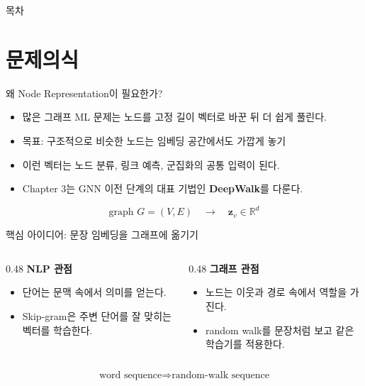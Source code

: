 \begin{frame}
  \titlepage
\end{frame}

\begin{frame}{목차}
  \tableofcontents
\end{frame}

\section{문제의식}

\begin{frame}{왜 Node Representation이 필요한가?}
\begin{itemize}
  \item 많은 그래프 ML 문제는 노드를 고정 길이 벡터로 바꾼 뒤 더 쉽게 풀린다.
  \item 목표: 구조적으로 비슷한 노드는 임베딩 공간에서도 가깝게 놓기
  \item 이런 벡터는 노드 분류, 링크 예측, 군집화의 공통 입력이 된다.
  \item Chapter 3는 GNN 이전 단계의 대표 기법인 \textbf{DeepWalk}를 다룬다.
\end{itemize}
\vspace{0.4em}
\[
\text{graph } G=(V,E) \quad \rightarrow \quad \mathbf{z}_v \in \mathbb{R}^d
\]
\end{frame}

\begin{frame}{핵심 아이디어: 문장 임베딩을 그래프에 옮기기}
\begin{columns}[T,onlytextwidth]
\begin{column}{0.48\textwidth}
\textbf{NLP 관점}
\begin{itemize}
  \item 단어는 문맥 속에서 의미를 얻는다.
  \item Skip-gram은 주변 단어를 잘 맞히는 벡터를 학습한다.
\end{itemize}
\end{column}
\begin{column}{0.48\textwidth}
\textbf{그래프 관점}
\begin{itemize}
  \item 노드는 이웃과 경로 속에서 역할을 가진다.
  \item random walk를 문장처럼 보고 같은 학습기를 적용한다.
\end{itemize}
\end{column}
\end{columns}
\vspace{0.5em}
\[
\text{word sequence} \Rightarrow \text{random-walk sequence}
\]
\end{frame}

